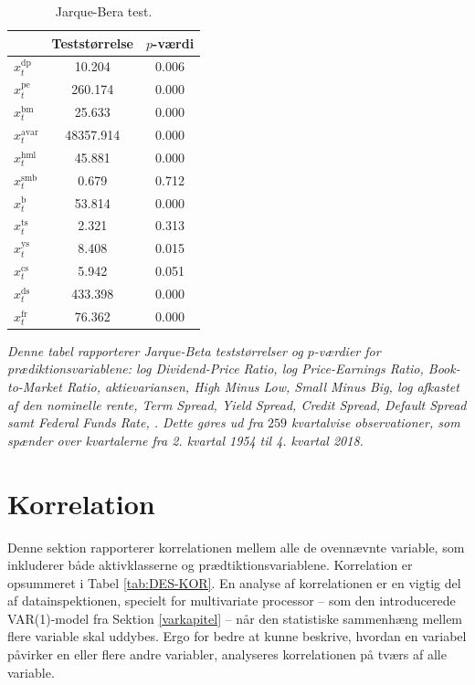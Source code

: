 \documentclass[
  a4paper,
  oneside]{memoir}
\begin{document}
\begin{table}[H]

\caption{\label{tab:JB-TILSTANDSVARIABLE}Jarque-Bera test.}
\centering
\begin{threeparttable}
\begin{tabular}[t]{lcc}
\toprule
  & Teststørrelse & $p$-værdi\\
\midrule
\rowcolor{gray!6}  $x_t^{\text{dp}}$ & 10.204 & 0.006\\
$x_t^{\text{pe}}$ & 260.174 & 0.000\\
\rowcolor{gray!6}  $x_t^{\text{bm}}$ & 25.633 & 0.000\\
$x_t^{\text{avar}}$ & 48357.914 & 0.000\\
\rowcolor{gray!6}  $x_t^{\text{hml}}$ & 45.881 & 0.000\\
$x_t^{\text{smb}}$ & 0.679 & 0.712\\
\rowcolor{gray!6}  $x_t^{\text{b}}$ & 53.814 & 0.000\\
$x_t^{\text{ts}}$ & 2.321 & 0.313\\
\rowcolor{gray!6}  $x_t^{\text{ys}}$ & 8.408 & 0.015\\
$x_t^{\text{cs}}$ & 5.942 & 0.051\\
\rowcolor{gray!6}  $x_t^{\text{ds}}$ & 433.398 & 0.000\\
$x_t^{\text{fr}}$ & 76.362 & 0.000\\
\bottomrule
\end{tabular}
\begin{tablenotes}
\item \textit{Denne tabel rapporterer Jarque-Beta teststørrelser og $p$-værdier for prædiktionsvariablene: log Dividend-Price Ratio, log Price-Earnings Ratio, Book-to-Market Ratio, aktievariansen, High Minus Low, Small Minus Big, log afkastet af den nominelle rente, Term Spread, Yield Spread, Credit Spread, Default Spread samt Federal Funds Rate, \citep{Jarque1980}. Dette gøres ud fra $259$ kvartalvise observationer, som spænder over kvartalerne fra 2. kvartal 1954 til 4. kvartal 2018.}
\end{tablenotes}
\end{threeparttable}
\end{table}

\hypertarget{korr}{%
\section{Korrelation}\label{korr}}

Denne sektion rapporterer korrelationen mellem alle de ovennævnte variable, som inkluderer både aktivklasserne og prædtiktionsvariablene. Korrelation er opsummeret i Tabel \ref{tab:DES-KOR}. En analyse af korrelationen er en vigtig del af datainspektionen, specielt for multivariate processor -- som den introducerede VAR(1)-model fra Sektion \ref{varkapitel} -- når den statistiske sammenhæng mellem flere variable skal uddybes. Ergo for bedre at kunne beskrive, hvordan en variabel påvirker en eller flere andre variabler, analyseres korrelationen på tværs af alle variable.
\end{document}
